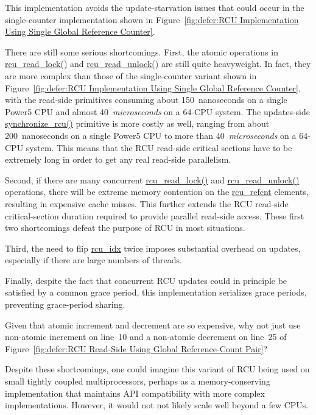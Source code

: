 This implementation avoids the update-starvation issues that could
occur in the single-counter implementation shown in
Figure~\ref{fig:defer:RCU Implementation Using Single Global Reference Counter}.

There are still some serious shortcomings.
First, the atomic operations in \url{rcu_read_lock()}
and \url{rcu_read_unlock()}
are still quite heavyweight.
In fact, they are more complex than those
of the single-counter variant shown in
Figure~\ref{fig:defer:RCU Implementation Using Single Global Reference Counter},
with the read-side primitives consuming about 150~nanoseconds on a single
Power5 CPU and almost 40~\emph{microseconds} on a 64-CPU system.
The updates-side \url{synchronize_rcu()} primitive is more costly as
well, ranging from about 200~nanoseconds on a single Power5 CPU to
more than 40~\emph{microseconds} on a 64-CPU system.
This means that the RCU read-side critical sections
have to be extremely long in order to get any real
read-side parallelism.

Second, if there are many concurrent \url{rcu_read_lock()}
and \url{rcu_read_unlock()} operations, there will
be extreme memory contention on the \url{rcu_refcnt}
elements, resulting in expensive cache misses.
This further extends the RCU read-side critical-section
duration required to provide parallel read-side access.
These first two shortcomings defeat the purpose of RCU in most
situations.

Third, the need to flip \url{rcu_idx} twice imposes substantial
overhead on updates, especially if there are large
numbers of threads.

Finally, despite the fact that concurrent RCU updates could in principle be
satisfied by a common grace period, this implementation
serializes grace periods, preventing grace-period
sharing.

\QuickQuiz{}
	Given that atomic increment and decrement are so expensive,
	why not just use non-atomic increment on line~10 and a
	non-atomic decrement on line~25 of
	Figure~\ref{fig:defer:RCU Read-Side Using Global Reference-Count Pair}?
 \QuickQuizEnd

Despite these shortcomings, one could imagine this variant
of RCU being used on small tightly coupled multiprocessors,
perhaps as a memory-conserving implementation that maintains
API compatibility with more complex implementations.
However, it would not not likely scale well beyond a few CPUs.


